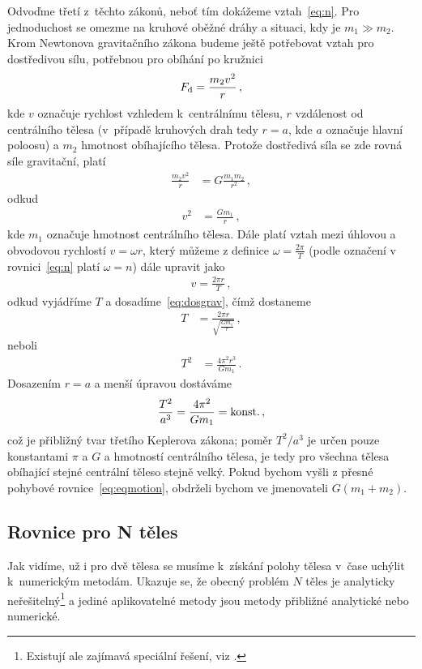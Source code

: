 \documentclass[A4paper, 12pt, oneside]{book}
\begin{document}
Odvoďme třetí z~těchto zákonů, neboť tím dokážeme vztah~\eqref{eq:n}. Pro jednoduchost se omezme na kruhové oběžné dráhy a situaci, kdy je $m_1 \gg m_2$. Krom Newtonova gravitačního zákona budeme ještě potřebovat vztah pro dostředivou sílu, potřebnou pro obíhání po kružnici
\begin{align}
	F_{\rm d}=\frac{m_2v^2}{r}\,,
\end{align}
kde $v$ označuje rychlost vzhledem k~centrálnímu tělesu, $r$ vzdálenost od centrálního tělesa (v~případě kruhových drah tedy $r=a$, kde $a$ označuje hlavní poloosu) a $m_2$ hmotnost obíhajícího tělesa. Protože dostředivá síla se zde rovná síle gravitační, platí
\begin{align}
	\frac{m_2v^2}{r}&=G\frac{m_1m_2}{r^2}\,,
\end{align}
	odkud
\begin{align}
	v^2&=\frac{Gm_1}{r}\,, \label{eq:dosgrav}
\end{align}
kde $m_1$ označuje hmotnost centrálního tělesa. Dále platí vztah mezi úhlovou a obvodovou rychlostí $v=\omega r$, který můžeme z definice $\omega=\frac{2\pi}{T}$ (podle označení v rovnici~\eqref{eq:n} platí $\omega=n$) dále upravit jako
\begin{align}
	v=\frac{2\pi r}{T}\,,
\end{align}
odkud vyjádříme $T$ a dosadíme~\eqref{eq:dosgrav}, čímž dostaneme
\begin{align}
	T&=\frac{2\pi r}{\sqrt{\frac{Gm_1}{r}}}\,,
\end{align}
	neboli
\begin{align}
	T^2&=\frac{4\pi^2 r^3}{Gm_1}\,.
\end{align}
Dosazením $r=a$ a menší úpravou dostáváme
\begin{align}
	\frac{T^2}{a^3}=\frac{4\pi^2}{Gm_1}={\rm konst.}\,,
\end{align}
což je přibližný tvar třetího Keplerova zákona; poměr $T^2/a^3$ je určen pouze konstantami $\pi$ a $G$ a hmotností centrálního tělesa, je tedy pro všechna tělesa obíhající stejné centrální těleso stejně velký. Pokud bychom vyšli z přesné pohybové rovnice~\eqref{eq:eqmotion}, obdrželi bychom ve jmenovateli $G(m_1+m_2)$. 

\subsection{Rovnice pro N těles}
Jak vidíme, už i pro dvě tělesa se musíme k~získání polohy tělesa v~čase uchýlit k~numerickým metodám. Ukazuje se, že obecný problém $N$ těles je analyticky neřešitelný\footnote{Existují ale zajímavá speciální řešení, viz \cite{cohan12}.} a jediné aplikovatelné metody jsou metody přibližné analytické nebo numerické.
\end{document}
